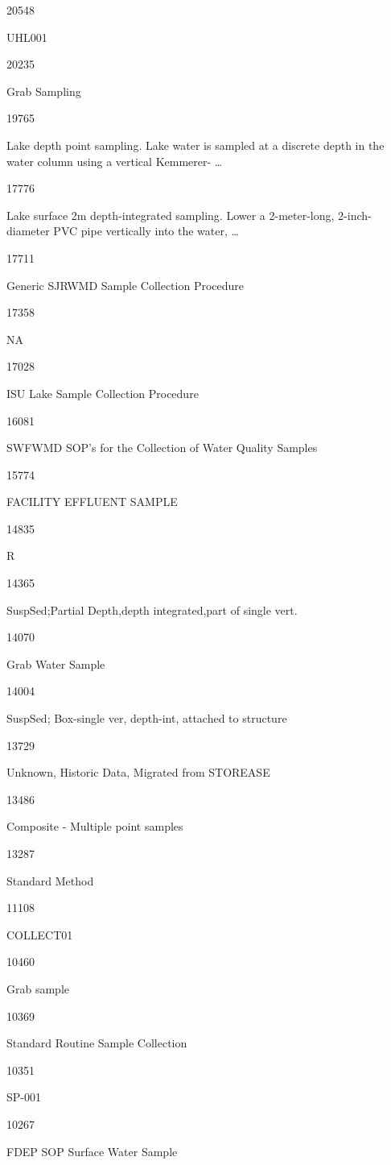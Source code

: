 \documentclass[]{article}
\begin{document}
20548

UHL001

20235

Grab Sampling

19765

Lake depth point sampling. Lake water is sampled at a discrete depth in
the water column using a vertical Kemmerer- \ldots{}

17776

Lake surface 2m depth-integrated sampling. Lower a 2-meter-long,
2-inch-diameter PVC pipe vertically into the water, \ldots{}

17711

Generic SJRWMD Sample Collection Procedure

17358

NA

17028

ISU Lake Sample Collection Procedure

16081

SWFWMD SOP's for the Collection of Water Quality Samples

15774

FACILITY EFFLUENT SAMPLE

14835

R

14365

SuspSed;Partial Depth,depth integrated,part of single vert.

14070

Grab Water Sample

14004

SuspSed; Box-single ver, depth-int, attached to structure

13729

Unknown, Historic Data, Migrated from STOREASE

13486

Composite - Multiple point samples

13287

Standard Method

11108

COLLECT01

10460

Grab sample

10369

Standard Routine Sample Collection

10351

SP-001

10267

FDEP SOP Surface Water Sample
\end{document}
